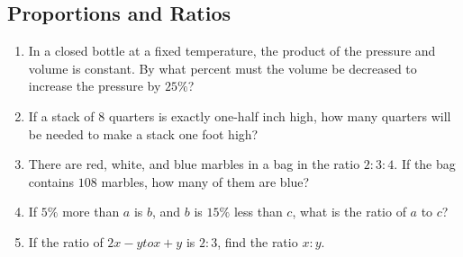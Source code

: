\documentclass{article}
\begin{document}
    \subsection*{Proportions and Ratios}
    \begin{enumerate}[resume]
        \item In a closed bottle at a fixed temperature, the product of the pressure and volume is constant. By what percent must the volume be decreased to increase the pressure by $25\%$?
        \vspace{3cm}
        \item If a stack of $8$ quarters is exactly one-half inch high, how many quarters will be needed to make a stack one foot high?
        \vspace{3cm}
        \item There are red, white, and blue marbles in a bag in the ratio $2 : 3 : 4$. If the bag contains $108$ marbles, how many of them are blue?
        \vspace{3cm}
        \item If $5\%$ more than $a$ is $b$, and $b$ is $15\%$ less than $c$, what is the ratio of $a$ to $c$?
        \vspace{3cm}
        \item If the ratio of $2x - y to x + y$ is $2 : 3$, find the ratio $x : y$.
        \vspace{3cm}
    \end{enumerate}
\end{document}
